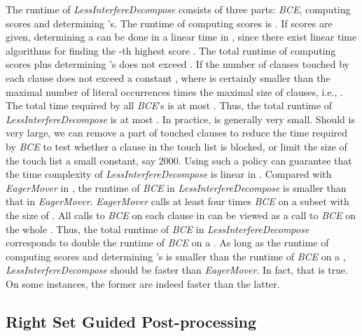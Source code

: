 \documentclass{llncs}
\begin{document}
\nopagebreak[3]

   The runtime of \emph{LessInterfereDecompose} consists of three
   parts: \emph{BCE}, computing scores and determining 's. The runtime of
computing scores is . If scores are
given, determining a  can be done in a linear time in ,
since there exist linear time algorithms for finding the -th
highest score \cite{find:97,find:00}. The total runtime of computing
scores plus determining 's does not exceed . If the
number of clauses touched by each clause does not exceed a constant
, where   is certainly smaller than the maximal
number of literal occurrences times the maximal size of clauses,
i.e., . The total time required by all \emph{BCE}'s is at most . Thus, the total runtime of \emph{LessInterfereDecompose} is
at most . In practice,  is generally
very small. Should  is very large, we can remove a part of
touched clauses to reduce the time required by \emph{BCE} to test
whether a clause in the touch list is blocked, or limit the size of
the touch list a small constant, say 2000. Using such a policy can
guarantee that the time complexity of \emph{LessInterfereDecompose}
is linear in . Compared with \emph{EagerMover} in
\cite{EagerMover:14}, the runtime of \emph{BCE} in
\emph{LessInterfereDecompose} is smaller than that in
\emph{EagerMover}.  \emph{EagerMover} calls at least four times
\emph{BCE} on a subset with the size of . All calls to
\emph{BCE} on each clause  in  can be viewed as a call to
\emph{BCE} on the whole . Thus, the total runtime of \emph{BCE}
in \emph{LessInterfereDecompose} corresponds to double the runtime
of \emph{BCE} on a . As long as the runtime of computing scores
and determining 's is smaller than the runtime of \emph{BCE} on a
, \emph{LessInterfereDecompose} should be faster than
\emph{EagerMover}. In fact, that is true. On some instances, the
former are indeed faster than the latter.


\subsection{Right Set Guided Post-processing}
\end{document}
